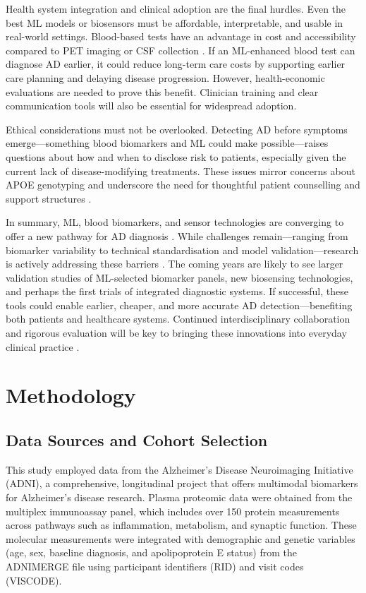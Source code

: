 \documentclass[a4paper,12pt]{article}
\begin{document}
Health system integration and clinical adoption are the final hurdles. Even the best ML models or biosensors must be affordable, interpretable, and usable in real-world settings. Blood-based tests have an advantage in cost and accessibility compared to PET imaging or CSF collection \cite{hampel2018blood}. If an ML-enhanced blood test can diagnose AD earlier, it could reduce long-term care costs by supporting earlier care planning and delaying disease progression. However, health-economic evaluations are needed to prove this benefit. Clinician training and clear communication tools will also be essential for widespread adoption.

Ethical considerations must not be overlooked. Detecting AD before symptoms emerge—something blood biomarkers and ML could make possible—raises questions about how and when to disclose risk to patients, especially given the current lack of disease-modifying treatments. These issues mirror concerns about APOE genotyping and underscore the need for thoughtful patient counselling and support structures \cite{roberts2013amyloid}.

In summary, ML, blood biomarkers, and sensor technologies are converging to offer a new pathway for AD diagnosis \cite{winchester2023artificial}. While challenges remain—ranging from biomarker variability to technical standardisation and model validation—research is actively addressing these barriers \cite{hampel2018blood}. The coming years are likely to see larger validation studies of ML-selected biomarker panels, new biosensing technologies, and perhaps the first trials of integrated diagnostic systems. If successful, these tools could enable earlier, cheaper, and more accurate AD detection—benefiting both patients and healthcare systems. Continued interdisciplinary collaboration and rigorous evaluation will be key to bringing these innovations into everyday clinical practice \cite{martin2019evaluating}.

\newpage
\section{Methodology}

\subsection{Data Sources and Cohort Selection}
This study employed data from the Alzheimer’s Disease Neuroimaging Initiative (ADNI), a comprehensive, longitudinal project that offers multimodal biomarkers for Alzheimer’s disease research. Plasma proteomic data were obtained from the multiplex immunoassay panel, which includes over 150 protein measurements across pathways such as inflammation, metabolism, and synaptic function. These molecular measurements were integrated with demographic and genetic variables (age, sex, baseline diagnosis, and apolipoprotein E status) from the ADNIMERGE file using participant identifiers (RID) and visit codes (VISCODE).  
\end{document}
